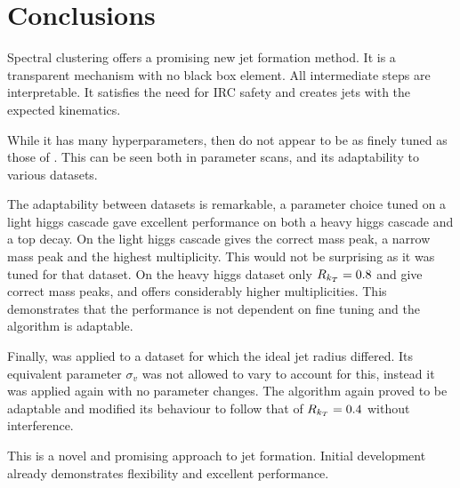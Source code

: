 \section{Conclusions}
Spectral clustering offers a promising new jet formation method.
It is a transparent mechanism with no black box element.
All intermediate steps are interpretable.
It satisfies the need for IRC safety and creates jets with the expected kinematics.

While it has many hyperparameters, then do not appear to be as finely tuned as those of \genkt{}.
This can be seen both in parameter scans, and its adaptability to various datasets.

The adaptability between datasets is remarkable,
a \spectral{} parameter choice tuned on a light higgs cascade
gave excellent performance on both a heavy higgs cascade and a top decay.
On the light higgs cascade \spectral{} gives the correct mass peak,
a narrow mass peak and the highest multiplicity.
This would not be surprising as it was tuned for that dataset.
On the heavy higgs dataset only \antikt{} \(R_{k_T}{} = 0.8\) 
and \spectral{} give correct mass peaks, and \spectral{} offers considerably higher multiplicities.
This demonstrates that the performance is not dependent on fine tuning and the algorithm is adaptable.

Finally, \spectral{} was applied to a dataset for which the ideal jet radius differed.
Its equivalent parameter \(\sigma_v\) was not allowed to vary to account for this,
instead it was applied again with no parameter changes.
The algorithm again proved to be adaptable and modified its behaviour to follow that of \(R_{k_T}{} = 0.4\)
without interference.

This is a novel and promising approach to jet formation. 
Initial development already demonstrates flexibility and excellent performance.

